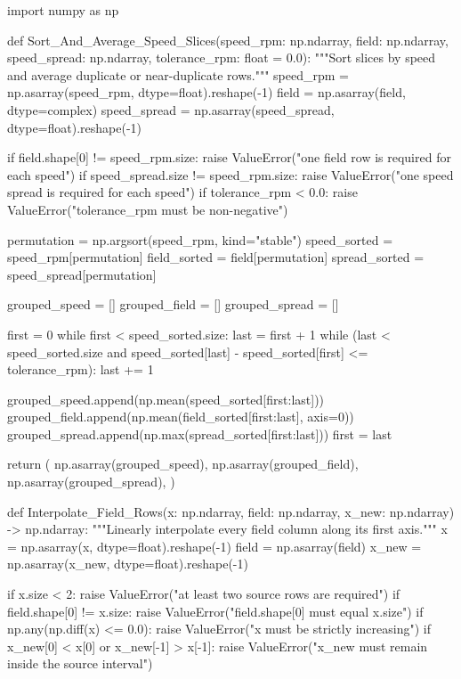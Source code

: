 \begin{python}
import numpy as np


def Sort_And_Average_Speed_Slices(speed_rpm: np.ndarray,
                                  field: np.ndarray,
                                  speed_spread: np.ndarray,
                                  tolerance_rpm: float = 0.0):
    """Sort slices by speed and average duplicate or near-duplicate rows."""
    speed_rpm = np.asarray(speed_rpm, dtype=float).reshape(-1)
    field = np.asarray(field, dtype=complex)
    speed_spread = np.asarray(speed_spread, dtype=float).reshape(-1)

    if field.shape[0] != speed_rpm.size:
        raise ValueError("one field row is required for each speed")
    if speed_spread.size != speed_rpm.size:
        raise ValueError("one speed spread is required for each speed")
    if tolerance_rpm < 0.0:
        raise ValueError("tolerance_rpm must be non-negative")

    permutation = np.argsort(speed_rpm, kind="stable")
    speed_sorted = speed_rpm[permutation]
    field_sorted = field[permutation]
    spread_sorted = speed_spread[permutation]

    grouped_speed = []
    grouped_field = []
    grouped_spread = []

    first = 0
    while first < speed_sorted.size:
        last = first + 1
        while (last < speed_sorted.size
               and speed_sorted[last] - speed_sorted[first]
               <= tolerance_rpm):
            last += 1

        grouped_speed.append(np.mean(speed_sorted[first:last]))
        grouped_field.append(np.mean(field_sorted[first:last], axis=0))
        grouped_spread.append(np.max(spread_sorted[first:last]))
        first = last

    return (
        np.asarray(grouped_speed),
        np.asarray(grouped_field),
        np.asarray(grouped_spread),
    )


def Interpolate_Field_Rows(x: np.ndarray,
                           field: np.ndarray,
                           x_new: np.ndarray) -> np.ndarray:
    """Linearly interpolate every field column along its first axis."""
    x = np.asarray(x, dtype=float).reshape(-1)
    field = np.asarray(field)
    x_new = np.asarray(x_new, dtype=float).reshape(-1)

    if x.size < 2:
        raise ValueError("at least two source rows are required")
    if field.shape[0] != x.size:
        raise ValueError("field.shape[0] must equal x.size")
    if np.any(np.diff(x) <= 0.0):
        raise ValueError("x must be strictly increasing")
    if x_new[0] < x[0] or x_new[-1] > x[-1]:
        raise ValueError("x_new must remain inside the source interval")


\end{python}

